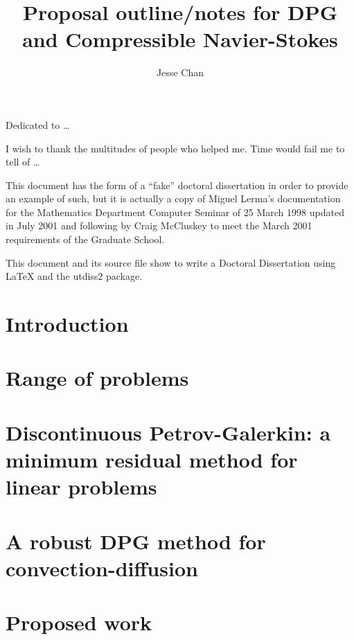 \documentclass{report}
\date{}
\author{Jesse Chan}
\title{Proposal outline/notes for DPG and Compressible Navier-Stokes}
\begin{document}
\copyrightpage          %
\commcertpage           %
\titlepage

\begin{dedication}
%
Dedicated to \ldots
\end{dedication}


\begin{acknowledgments}		%
%
I wish to thank the multitudes of people who helped me. Time would
fail me to tell of \ldots
\end{acknowledgments}

\utabstract
{}%
\indent
This document has the form of a ``fake'' doctoral dissertation
in order to provide an example of such, but it is actually a
copy of Miguel Lerma's documentation for the Mathematics
Department Computer Seminar of 25 March 1998 updated in July 2001
and following by Craig McCluskey to meet the March 2001
requirements of the Graduate School.

This document and its source file show to write a Doctoral Dissertation using 
\LaTeX{} and the utdiss2 package. 

\tableofcontents   %



\chapter{Introduction}



\chapter{Range of problems}



\chapter{Discontinuous Petrov-Galerkin: a minimum residual method for linear problems}




\chapter{A robust DPG method for convection-diffusion}



\chapter{Proposed work}









\appendix

%
\end{document}
